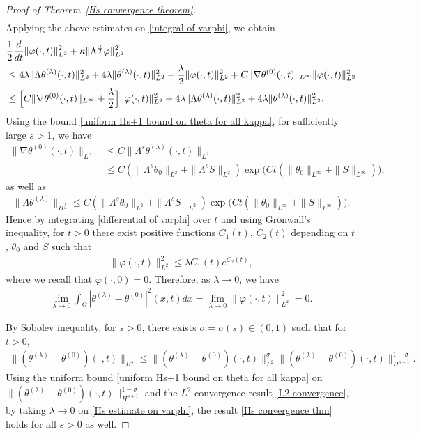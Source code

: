 \documentclass[reqno]{amsart}%
\theoremstyle{definition}
\theoremstyle{remark}
\numberwithin{equation}{section}
\newcommand{\1}{\mathbf{1}}
\numberwithin{equation}{section}
\numberwithin{theorem}{section}
\numberwithin{figure}{section}
\begin{document}
\begin{proof}[Proof of Theorem~\ref{Hs convergence theorem}]
\begin{align*}
\end{align*}
Applying the above estimates on \eqref{integral of varphi}, we obtain
\begin{align}\label{differential of varphi}
&\frac{1}{2}\frac{d}{dt}\|\varphi(\cdot,t)\|_{L^2}^2+\kappa\|\Lambda^{\frac{\gamma}{2}}\varphi\|^2_{L^2}\notag\\
&\le4\lambda\|\Lambda\theta^{(\lambda)}(\cdot,t)\|^2_{L^2}+4\lambda\|\theta^{(\lambda)}(\cdot,t)\|^2_{L^2}+\frac{\lambda}{2}\|\varphi(\cdot,t)\|^2_{L^2}+C\|\nabla\theta^{(0)}(\cdot,t)\|_{L^\infty}\|\varphi(\cdot,t)\|_{L^2}^2\notag\\
&\le\Big[C\|\nabla\theta^{(0)}(\cdot,t)\|_{L^\infty}+\frac{\lambda}{2}\Big]\|\varphi(\cdot,t)\|_{L^2}^2+4\lambda\|\Lambda\theta^{(\lambda)}(\cdot,t)\|^2_{L^2}+4\lambda\|\theta^{(\lambda)}(\cdot,t)\|^2_{L^2}.
\end{align}
Using the bound \eqref{uniform Hs+1 bound on theta for all kappa}, for sufficiently large $s>1$, we have
\begin{align*}
\|\nabla\theta^{(0)}(\cdot,t)\|_{L^\infty}&\le C\|\Lambda^{s}\theta^{(\lambda)}(\cdot,t)\|_{L^2}\\
&\le C(\|\Lambda^{s}\theta_0\|_{L^2}+\|\Lambda^{s}S\|_{L^2})\exp\Big(Ct(\|\theta_0\|_{L^\infty}+\|S\|_{L^\infty})\Big),
\end{align*}
as well as
\begin{align*}
\|\Lambda\theta^{(\lambda)}\|_{H^\frac{1}{2}}\le C(\|\Lambda^{s}\theta_0\|_{L^2}+\|\Lambda^{s}S\|_{L^2})\exp\Big(Ct(\|\theta_0\|_{L^\infty}+\|S\|_{L^\infty})\Big).
\end{align*}
Hence by integrating \eqref{differential of varphi} over $t$ and using Gr\"{o}nwall's inequality, for $t>0$ there exist positive functions $C_1(t)$, $C_2(t)$ depending on $t$, $\theta_0$ and $S$ such that
\begin{align*}
\|\varphi(\cdot,t)\|_{L^2}^2\le \lambda C_1(t)e^{C_2(t)},
\end{align*}
where we recall that $\varphi(\cdot,0)=0$. Therefore, as $\lambda\rightarrow0$, we have 
\begin{align}\label{L2 convergence}
\lim_{\lambda\rightarrow0}\int_{\Omega}|\theta^{(\lambda)}-\theta^{(0)}|^2(x,t)dx=\lim_{\lambda\rightarrow0}\|\varphi(\cdot,t)\|_{L^2}^2=0.
\end{align}

 By Sobolev inequality, for $s>0$, there exists $\sigma=\sigma(s)\in(0,1)$ such that for $t>0$,
\begin{align}\label{Hs estimate on varphi}
\|(\theta^{(\lambda)}-\theta^{(0)})(\cdot,t)\|_{H^s}\le\|(\theta^{(\lambda)}-\theta^{(0)})(\cdot,t)\|_{L^2}^\sigma\|(\theta^{(\lambda)}-\theta^{(0)})(\cdot,t)\|_{H^{s+1}}^{1-\sigma}.
\end{align}
Using the uniform bound \eqref{uniform Hs+1 bound on theta for all kappa} on $\|(\theta^{(\lambda)}-\theta^{(0)})(\cdot,t)\|_{H^{s+1}}^{1-\sigma}$ and the $L^2$-convergence result \eqref{L2 convergence}, by taking $\lambda\to0$ on \eqref{Hs estimate on varphi}, the result \eqref{Hs convergence thm} holds for all $s>0$ as well. 
\end{proof}
\end{document}
